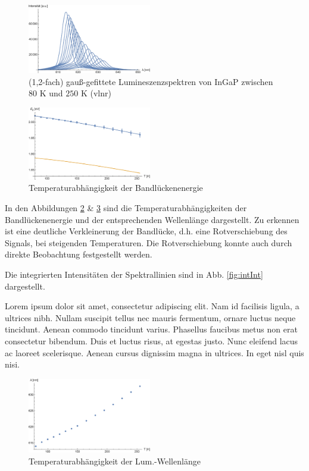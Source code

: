 \documentclass[aps,twocolumn,secnumarabic,nobalancelastpage,amsmath,amssymb,
nofootinbib,superscriptaddress]{revtex4-1}
\begin{document}
\begin{figure}[h!]
  \centering
  \includegraphics[width=0.48\textwidth]{../Messung/allfitsplot.eps}
  \caption{\label{fig:spek} (1,2-fach) gauß-gefittete Lumineszenzspektren von InGaP zwischen $80\text{ K}$ und $250\text{ K}$ (vlnr)}
\end{figure}

\begin{figure}[t]
  \centering
  \includegraphics[width=0.48\textwidth]{../Messung/energtemp.eps}
  \caption{\label{fig:EgapT} Temperaturabhängigkeit der Bandlückenenergie}
\end{figure}

\noindent In den Abbildungen \ref{fig:EgapT} \& \ref{fig:lamT} sind die Temperaturabhängigkeiten der
Bandlückenenergie und der entsprechenden Wellenlänge dargestellt. Zu erkennen ist eine deutliche
Verkleinerung der Bandlücke, d.h. eine Rotverschiebung des Signals, bei steigenden Temperaturen.
Die Rotverschiebung konnte auch durch direkte Beobachtung festgestellt werden.

Die integrierten Intensitäten der Spektrallinien sind in Abb. \ref{fig:intInt} dargestellt.

Lorem ipsum dolor sit amet, consectetur adipiscing elit. Nam id facilisis ligula,
a ultrices nibh. Nullam suscipit tellus nec mauris fermentum, ornare luctus neque
tincidunt. Aenean commodo tincidunt varius. Phasellus faucibus metus non erat
consectetur bibendum. Duis et luctus risus, at egestas justo. Nunc eleifend lacus
ac laoreet scelerisque. Aenean cursus dignissim magna in ultrices. In eget nisl
quis nisi.

\begin{figure}[b]
  \centering
  \includegraphics[width=0.48\textwidth]{../Messung/peaktemp.eps}
  \caption{\label{fig:lamT} Temperaturabhängigkeit der Lum.-Wellenlänge}
\end{figure}
\end{document}
